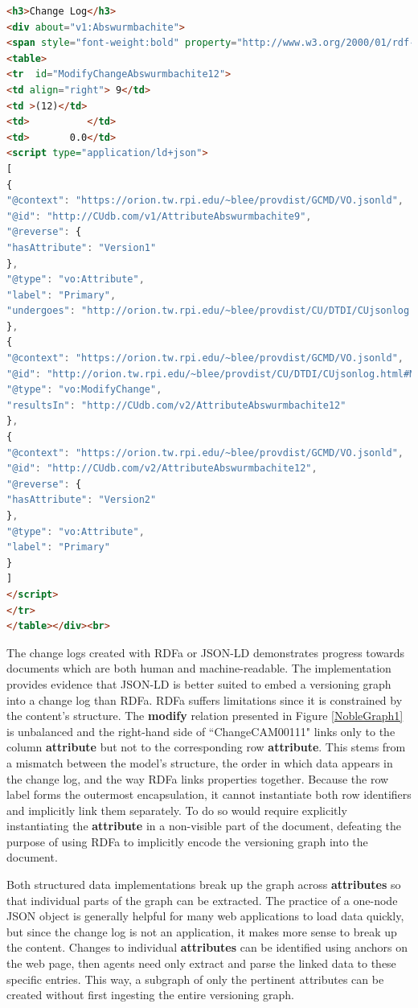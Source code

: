 \begin{lstlisting}[language=HTML, caption=Abswurmbachite JSON-LD, label=json_list]
<h3>Change Log</h3>
<div about="v1:Abswurmbachite">
<span style="font-weight:bold" property="http://www.w3.org/2000/01/rdf-schema#label">Abswurmbachite</span>
<table>
<tr  id="ModifyChangeAbswurmbachite12">
<td align="right"> 9</td>
<td >(12)</td>
<td>          </td>
<td>       0.0</td>
<script type="application/ld+json">
[
{
"@context": "https://orion.tw.rpi.edu/~blee/provdist/GCMD/VO.jsonld", 
"@id": "http://CUdb.com/v1/AttributeAbswurmbachite9", 
"@reverse": {
"hasAttribute": "Version1"
}, 
"@type": "vo:Attribute", 
"label": "Primary", 
"undergoes": "http://orion.tw.rpi.edu/~blee/provdist/CU/DTDI/CUjsonlog.html#ModifyChangeAbswurmbachite12"
}, 
{
"@context": "https://orion.tw.rpi.edu/~blee/provdist/GCMD/VO.jsonld", 
"@id": "http://orion.tw.rpi.edu/~blee/provdist/CU/DTDI/CUjsonlog.html#ModifyChangeAbswurmbachite12", 
"@type": "vo:ModifyChange", 
"resultsIn": "http://CUdb.com/v2/AttributeAbswurmbachite12"
}, 
{
"@context": "https://orion.tw.rpi.edu/~blee/provdist/GCMD/VO.jsonld", 
"@id": "http://CUdb.com/v2/AttributeAbswurmbachite12", 
"@reverse": {
"hasAttribute": "Version2"
}, 
"@type": "vo:Attribute", 
"label": "Primary"
}
]
</script>
</tr>
</table></div><br>
\end{lstlisting}

The change logs created with RDFa or JSON-LD demonstrates progress towards documents which are both human and machine-readable.
The implementation provides evidence that JSON-LD is better suited to embed a versioning graph into a change log than RDFa.
RDFa suffers limitations since it is constrained by the content's structure.
The \textbf{modify} relation presented in Figure \ref{NobleGraph1} is unbalanced and the right-hand side of ``ChangeCAM00111" links only to the column \textbf{attribute} but not to the corresponding row \textbf{attribute}.
This stems from a mismatch between the model's structure, the order in which data appears in the change log, and the way RDFa links properties together.
Because the row label forms the outermost encapsulation, it cannot instantiate both row identifiers and implicitly link them separately.
To do so would require explicitly instantiating the \textbf{attribute} in a non-visible part of the document, defeating the purpose of using RDFa to implicitly encode the versioning graph into the document.

Both structured data implementations break up the graph across \textbf{attributes} so that individual parts of the graph can be extracted.
The practice of a one-node JSON object is generally helpful for many web applications to load data quickly, but since the change log is not an application, it makes more sense to break up the content.
Changes to individual \textbf{attributes} can be identified using anchors on the web page, then agents need only extract and parse the linked data to these specific entries.
This way, a subgraph of only the pertinent attributes can be created without first ingesting the entire versioning graph.

